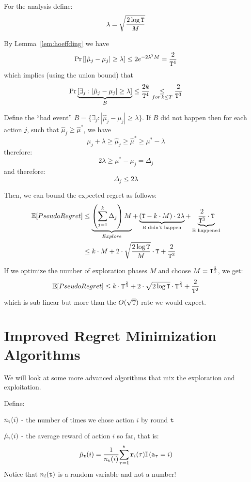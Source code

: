 For the analysis define:
\[
\lambda=\sqrt{\frac{2\log {\tt T}}{M}}
\]

By Lemma~\ref{lem:hoeffding} we have
\[
\Pr\left[\left|\hat{\mu}_{j}-\mu_{j}\right|\ge\lambda\right]  \le
2e^{-2\lambda^2 M}=\frac{2}{{\tt T}^{4}}
\]
which implies (using the union bound) that
\[
\Pr\underbrace{\left[\exists_{j}:\left|\hat{\mu}_{j}-\mu_{j}\right|\ge\lambda\right]}_{B}
 \le  \frac{2k}{{\tt T}^{4}}\underset{for\,k\leq T}{\leq}\frac{2}{{\tt T}^{3}}
\]

Define the ``bad event''
$B=\{\exists_{j}:\left|\hat{\mu}_{j}-\mu_{j}\right|\ge\lambda\}$. If
$B$ did not happen then for each action $j$, such that
$\hat{\mu}_{j}\ge\hat{\mu}^{*}$, we have
\[
\mu_{j}+\lambda\ge\hat{\mu}_{j}\ge\hat{\mu}^{*}\ge\mu^{*}-\lambda
\]
therefore:
\[
2\lambda\ge\mu^{*}-\mu_{j}=\Delta_{j}
\]
and therefore:
\[
\Delta_{j}\le2\lambda
\]

Then, we can bound the expected regret as follows:
\begin{align*}
\mathbb{E}[PseudoRegret] & \leq  \underbrace{\left({\displaystyle
\sum_{j=1}^{k}\Delta_{j}}\right)M}_{Explore}+\underbrace{\left({\tt T}-k\cdot
M\right)\cdot2\lambda}_{\text{B didn't
happen}}+\underbrace{\frac{2}{{\tt T}^{3}}\cdot {\tt T}}_{\text{B happened}}\\
 & \leq  k\cdot M+2\cdot\sqrt{\frac{2\log {\tt T}}{M}}\cdot {\tt T}+\frac{2}{{\tt T}^{2}}
\end{align*}

If we optimize the number of exploration phases $M$ and choose $M={\tt T}^{\frac{2}{3}}$,
we get:
\[
\mathbb{E}[PseudoRegret]  \leq 
k\cdot {\tt T}^{\frac{2}{3}}+2\cdot\sqrt{2\log {\tt T}}\cdot
{\tt T}^{\frac{2}{3}}+\frac{2}{{\tt T}^{2}}
\]
which is sub-linear but more than the $O(\sqrt{{\tt T}})$ rate we would
expect.

\section{Improved Regret Minimization Algorithms}

We will look at some more advanced algorithms that mix the
exploration and exploitation.

Define:

$n_{{\tt t}}(i)$ - the number of times we chose action $i$ by round ${\tt t}$

$\hat{\mu}_{{\tt t}}(i)$ - the average reward of action $i$ so far, that
is:
\[
\hat{\mu}_{{\tt t}}(i)=\frac{1}{n_{{\tt t}}(i)}{\displaystyle
\sum_{\tau=1}^{{\tt t}}{\tt r}_{i}(\tau)}\mathbb{I}\left({\tt a}_{\tau}=i\right)
\]
Notice that $n_{i}({\tt t})$ is a random variable and not a number!

